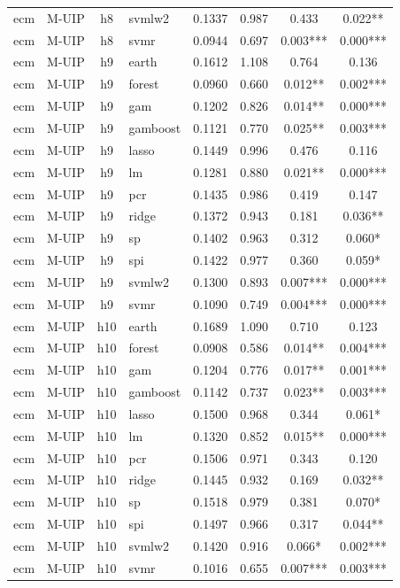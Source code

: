 \begin{ThreePartTable}
\begin{longtable}[t]{llclcccc}
ecm & M-UIP & h8 & svmlw2 & 0.1337 & 0.987 & 0.433 & 0.022**\\
ecm & M-UIP & h8 & svmr & 0.0944 & 0.697 & 0.003*** & 0.000***\\
\addlinespace
ecm & M-UIP & h9 & earth & 0.1612 & 1.108 & 0.764 & 0.136\\
ecm & M-UIP & h9 & forest & 0.0960 & 0.660 & 0.012** & 0.002***\\
ecm & M-UIP & h9 & gam & 0.1202 & 0.826 & 0.014** & 0.000***\\
ecm & M-UIP & h9 & gamboost & 0.1121 & 0.770 & 0.025** & 0.003***\\
ecm & M-UIP & h9 & lasso & 0.1449 & 0.996 & 0.476 & 0.116\\
ecm & M-UIP & h9 & lm & 0.1281 & 0.880 & 0.021** & 0.000***\\
ecm & M-UIP & h9 & pcr & 0.1435 & 0.986 & 0.419 & 0.147\\
ecm & M-UIP & h9 & ridge & 0.1372 & 0.943 & 0.181 & 0.036**\\
ecm & M-UIP & h9 & sp & 0.1402 & 0.963 & 0.312 & 0.060*\\
ecm & M-UIP & h9 & spi & 0.1422 & 0.977 & 0.360 & 0.059*\\
ecm & M-UIP & h9 & svmlw2 & 0.1300 & 0.893 & 0.007*** & 0.000***\\
ecm & M-UIP & h9 & svmr & 0.1090 & 0.749 & 0.004*** & 0.000***\\
\addlinespace
ecm & M-UIP & h10 & earth & 0.1689 & 1.090 & 0.710 & 0.123\\
ecm & M-UIP & h10 & forest & 0.0908 & 0.586 & 0.014** & 0.004***\\
ecm & M-UIP & h10 & gam & 0.1204 & 0.776 & 0.017** & 0.001***\\
ecm & M-UIP & h10 & gamboost & 0.1142 & 0.737 & 0.023** & 0.003***\\
ecm & M-UIP & h10 & lasso & 0.1500 & 0.968 & 0.344 & 0.061*\\
ecm & M-UIP & h10 & lm & 0.1320 & 0.852 & 0.015** & 0.000***\\
ecm & M-UIP & h10 & pcr & 0.1506 & 0.971 & 0.343 & 0.120\\
ecm & M-UIP & h10 & ridge & 0.1445 & 0.932 & 0.169 & 0.032**\\
ecm & M-UIP & h10 & sp & 0.1518 & 0.979 & 0.381 & 0.070*\\
ecm & M-UIP & h10 & spi & 0.1497 & 0.966 & 0.317 & 0.044**\\
ecm & M-UIP & h10 & svmlw2 & 0.1420 & 0.916 & 0.066* & 0.002***\\
ecm & M-UIP & h10 & svmr & 0.1016 & 0.655 & 0.007*** & 0.003***\\

\end{longtable}
\end{ThreePartTable}
